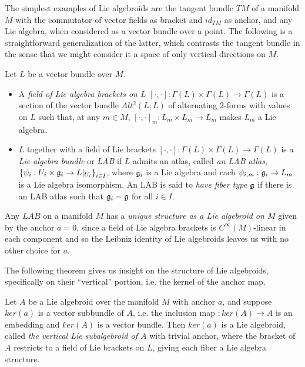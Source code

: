 \linea 

The simplest examples of Lie algebroids are the tangent bundle $TM$ of a manifold $M$ with the commutator of vector fields as bracket and $id_{TM}$ as anchor, and any Lie algebra, when considered as a vector bundle over a point. The following is a straightforward generalization of the latter, which contrasts the tangent bundle in the sense that we might consider it a space of only vertical directions on $M$.

\begin{definition}%
    Let $L$ be a vector bundle over $M$.
    
    \begin{itemize}
    
    \item A \emph{field of Lie algebra brackets on $L$} $[\cdot, \cdot]:\Gamma(L) \times \Gamma(L) \to \Gamma(L)$ is a section of the vector bundle $Alt^2(L; L)$ of alternating $2$-forms with values on $L$ such that, at any $m \in M$, $[\cdot, \cdot]_m:L_m \times L_m \to L_m$ makes $L_m$ a Lie algebra.
    
    \item $L$ together with a field of Lie brackets $[\cdot, \cdot]:\Gamma(L) \times \Gamma(L) \to \Gamma(L)$ is a \emph{Lie algebra bundle} or \emph{LAB} if $L$ admits an atlas, called \emph{an LAB atlas}, $\left\{ \psi_i: U_i \times \mathfrak{g}_i \to L|_{U_i} \right\}_{i \in I}$, where $\mathfrak{g}_i$ is a Lie algebra and each $\psi_{i, m}: \mathfrak{g}_i \to L_m$ is a Lie algebra isomorphism. An LAB is said to \emph{have fiber type $\mathfrak{g}$} if there is an LAB atlas such that $\mathfrak{g}_i = \mathfrak{g}$ for all $i \in I$.
    
    \end{itemize}
    
\end{definition}

Any $LAB$ on a manifold $M$ has a \emph{unique structure as a Lie algebroid on $M$} given by the anchor $a = 0$, since a field of Lie algebra brackets is $C^\infty(M)$-linear in each component and so the Leibniz identity of Lie algebroids leaves us with no other choice for $a$.

The following theorem gives us insight on the structure of Lie algebroids, specifically on their ``vertical'' portion, i.e. the kernel of the anchor map.

\begin{theorem} \label{theoFiberLie}
Let $A$ be a Lie algebroid over the manifold $M$ with anchor $a$, and suppose $ker(a)$ is a vector subbundle of $A$, i.e. the inclusion map $:ker(A) \to A$ is an embedding and $ker(A)$ is a vector bundle. Then $ker(a)$ %
is a Lie algebroid, called \emph{the vertical Lie subalgebroid of $A$} with trivial anchor, where the bracket of $A$ restricts to a field of Lie brackets on $L$, giving each fiber a Lie algebra structure.
\end{theorem}

